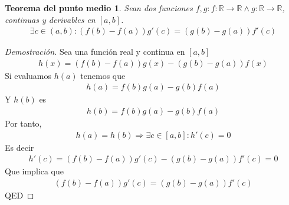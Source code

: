 \documentclass{article}
\newtheorem{midval}{Teorema del punto medio}
\begin{document}
\begin{midval}
    Sean dos funciones $f,g : f: \mathbb{R} \to \mathbb{R} \wedge g: \mathbb{R} \to \mathbb{R}$, continuas y derivables en $[a,b]$.
    \begin{equation}
        \begin{split}
            \exists c \in (a,b): (f(b)-f(a))g'(c) = (g(b) - g(a))f'(c)
        \end{split}
    \end{equation}
\end{midval}
\begin{proof}[Demostración]
    Sea una función real y continua en $[a,b]$
    \begin{equation}
        \begin{split}
            h(x)= (f(b)-f(a))g(x)- (g(b)-g(a))f(x)
        \end{split}
    \end{equation}
    Si evaluamos $h(a)$ tenemos que
    \begin{equation}
        \begin{split}
            h(a)= f(b)g(a)-g(b)f(a)
        \end{split}
    \end{equation}
    Y $h(b)$ es
    \begin{equation}
        \begin{split}
            h(b)=f(b)g(a)-g(b)f(a)
        \end{split}
    \end{equation}
    Por tanto,
    \begin{equation}
        \begin{split}
            h(a)=h(b)\Rightarrow \exists c \in [a,b] : h'(c)=0
        \end{split}
    \end{equation}
    Es decir
    \begin{equation}
        \begin{split}
            h'(c)=(f(b)-f(a))g'(c)- (g(b)-g(a))f'(c)=0
        \end{split}
    \end{equation}
    Que implica que
    \begin{equation}
        \begin{split}
            (f(b)-f(a))g'(c)=(g(b)-g(a))f'(c)
        \end{split}
    \end{equation}
    QED
\end{proof}
\end{document}
